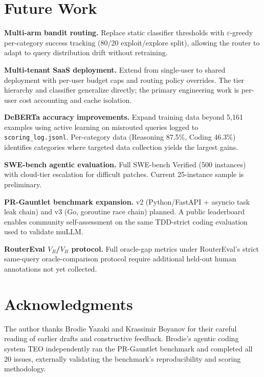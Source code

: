 \documentclass[11pt]{article}
\begin{document}
\section{Future Work}

\textbf{Multi-arm bandit routing.} Replace static classifier thresholds
with $\varepsilon$-greedy per-category success tracking (80/20
exploit/explore split), allowing the router to adapt to query
distribution drift without retraining.

\textbf{Multi-tenant SaaS deployment.} Extend from single-user to shared
deployment with per-user budget caps and routing policy overrides. The
tier hierarchy and classifier generalize directly; the primary
engineering work is per-user cost accounting and cache isolation.

\textbf{DeBERTa accuracy improvements.} Expand training data beyond
5,161 examples using active learning on misrouted queries logged to
\texttt{scoring\_log.jsonl}. Per-category data (Reasoning 87.5\%, Coding
46.3\%) identifies categories where targeted data collection yields the
largest gains.

\textbf{SWE-bench agentic evaluation.} Full SWE-bench Verified (500
instances) with cloud-tier escalation for difficult patches. Current
25-instance sample is preliminary.

\textbf{PR-Gauntlet benchmark expansion.} v2 (Python/FastAPI + asyncio
task leak chain) and v3 (Go, goroutine race chain) planned. A public
leaderboard enables community self-assessment on the same TDD-strict
coding evaluation used to validate muLLM.

\textbf{RouterEval $V_R$/$V_B$ protocol.} Full oracle-gap metrics under
RouterEval's strict same-query oracle-comparison protocol require
additional held-out human annotations not yet collected.

\section*{Acknowledgments}

The author thanks Brodie Yazaki and Krassimir Boyanov for their careful
reading of earlier drafts and constructive feedback. Brodie's agentic
coding system TEO independently ran the PR-Gauntlet benchmark and
completed all 20 issues, externally validating the benchmark's
reproducibility and scoring methodology.
\end{document}
